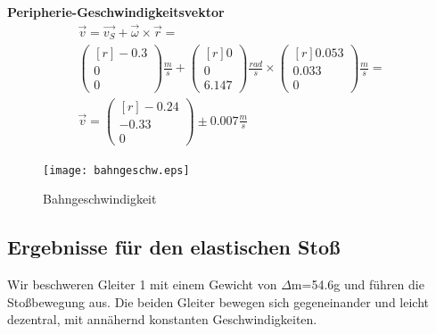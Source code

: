 \documentclass{article}
\begin{document}
\textbf{Peripherie-Geschwindigkeitsvektor}
\begin{gather*}
\vec{v}=\vec{v_S}+\vec{\omega}\times \vec{r} =\\
\begin{pmatrix*}[r]
-0.3 \\ 0 \\ 0
\end{pmatrix*}\frac{m}{s}
+ \begin{pmatrix*}[r]
0 \\ 0 \\ 6.147	
\end{pmatrix*}\frac{rad}{s}
\times
\begin{pmatrix*}[r]
0.053 \\ 0.033 \\ 0	
\end{pmatrix*}\frac{m}{s}
=
\\
\vec{v}=\begin{pmatrix*}[r]
-0.24 \\ -0.33 \\ 0	
\end{pmatrix*} \pm 0.007 \frac{m}{s}
\end{gather*}
\begin{figure}[H]
\caption{Bahngeschwindigkeit}
\begin{center}
\texttt{[image: bahngeschw.eps]}
\end{center}
\end{figure}

\subsection{Ergebnisse für den elastischen Stoß}

Wir beschweren Gleiter 1 mit einem Gewicht von $\Delta$m=54.6g und führen die Stoßbewegung aus. Die beiden Gleiter bewegen sich gegeneinander und leicht dezentral, mit annähernd konstanten Geschwindigkeiten. \\
\end{document}
